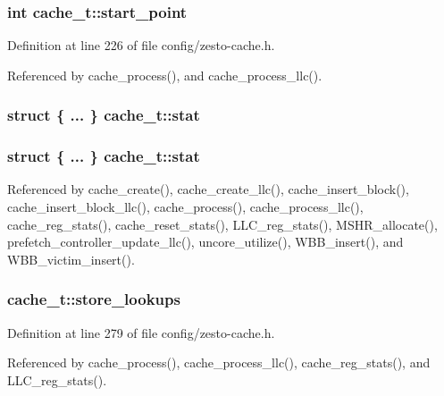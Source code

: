 \subsubsection[{start\_\-point}]{\setlength{\rightskip}{0pt plus 5cm}int {\bf cache\_\-t::start\_\-point}}\label{structcache__t_c1d9a422ff977575acf86e6b8ca4f479}




Definition at line 226 of file config/zesto-cache.h.

Referenced by cache\_\-process(), and cache\_\-process\_\-llc().
\subsubsection[{stat}]{\setlength{\rightskip}{0pt plus 5cm}struct \{ ... \}   {\bf cache\_\-t::stat}}\label{structcache__t_d9e9ac7507c1c60e0b13c3e0c43e3922}


\subsubsection[{stat}]{\setlength{\rightskip}{0pt plus 5cm}struct \{ ... \}   {\bf cache\_\-t::stat}}\label{structcache__t_32dc28e18962bbd27f1f42f936f02227}




Referenced by cache\_\-create(), cache\_\-create\_\-llc(), cache\_\-insert\_\-block(), cache\_\-insert\_\-block\_\-llc(), cache\_\-process(), cache\_\-process\_\-llc(), cache\_\-reg\_\-stats(), cache\_\-reset\_\-stats(), LLC\_\-reg\_\-stats(), MSHR\_\-allocate(), prefetch\_\-controller\_\-update\_\-llc(), uncore\_\-utilize(), WBB\_\-insert(), and WBB\_\-victim\_\-insert().
\subsubsection[{store\_\-lookups}]{ {\bf cache\_\-t::store\_\-lookups}}\label{structcache__t_9e21a82a48282c7d73766b96077e5ef4}




Definition at line 279 of file config/zesto-cache.h.

Referenced by cache\_\-process(), cache\_\-process\_\-llc(), cache\_\-reg\_\-stats(), and LLC\_\-reg\_\-stats().
